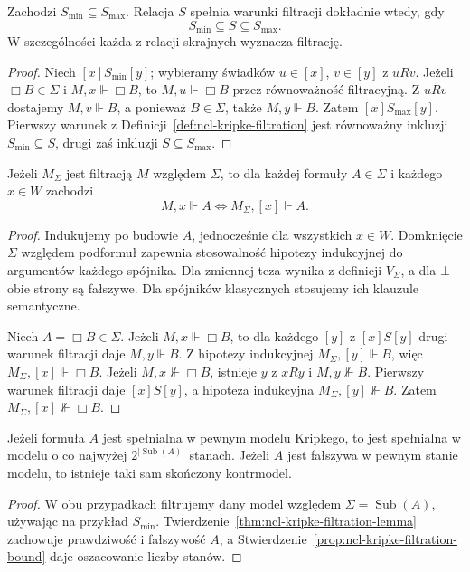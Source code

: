 \begin{stwierdzenie}
\label{prop:ncl-kripke-filtration-extremes}
Zachodzi $S_{\min}\subseteq S_{\max}$.
Relacja $S$ spełnia warunki filtracji
dokładnie wtedy, gdy
\[
 S_{\min}\subseteq S\subseteq S_{\max}.
\]
W szczególności każda z relacji skrajnych
wyznacza filtrację.
\end{stwierdzenie}
\begin{proof}
Niech $[x]S_{\min}[y]$; wybieramy świadków
$u\in[x]$, $v\in[y]$ z $uRv$.
Jeżeli $\Box B\in\Sigma$ i $M,x\Vdash\Box B$,
to $M,u\Vdash\Box B$ przez równoważność
filtracyjną. Z $uRv$ dostajemy $M,v\Vdash B$,
a ponieważ $B\in\Sigma$, także $M,y\Vdash B$.
Zatem $[x]S_{\max}[y]$.
Pierwszy warunek z
Definicji~\ref{def:ncl-kripke-filtration}
jest równoważny inkluzji $S_{\min}\subseteq S$,
drugi zaś inkluzji $S\subseteq S_{\max}$.
\end{proof}

\begin{twierdzenie}
\label{thm:ncl-kripke-filtration-lemma}
Jeżeli $M_\Sigma$ jest filtracją $M$
względem $\Sigma$, to dla każdej formuły
$A\in\Sigma$ i każdego $x\in W$ zachodzi
\[
 M,x\Vdash A\iff M_\Sigma,[x]\Vdash A.
\]
\end{twierdzenie}
\begin{proof}
Indukujemy po budowie $A$, jednocześnie
dla wszystkich $x\in W$.
Domknięcie $\Sigma$ względem podformuł
zapewnia stosowalność hipotezy indukcyjnej
do argumentów każdego spójnika.
Dla zmiennej teza wynika z definicji
$V_\Sigma$, a dla $\bot$ obie strony są
fałszywe. Dla spójników klasycznych
stosujemy ich klauzule semantyczne.

Niech $A=\Box B\in\Sigma$.
Jeżeli $M,x\Vdash\Box B$, to dla każdego
$[y]$ z $[x]S[y]$ drugi warunek filtracji
daje $M,y\Vdash B$. Z hipotezy indukcyjnej
$M_\Sigma,[y]\Vdash B$, więc
$M_\Sigma,[x]\Vdash\Box B$.
Jeżeli $M,x\not\Vdash\Box B$, istnieje
$y$ z $xRy$ i $M,y\not\Vdash B$.
Pierwszy warunek filtracji daje $[x]S[y]$,
a hipoteza indukcyjna
$M_\Sigma,[y]\not\Vdash B$. Zatem
$M_\Sigma,[x]\not\Vdash\Box B$.
\end{proof}

\begin{wniosek}
\label{cor:ncl-kripke-filtration-finite-realization}
Jeżeli formuła $A$ jest spełnialna w pewnym
modelu Kripkego, to jest spełnialna w modelu
o co najwyżej $2^{|\operatorname{Sub}(A)|}$ stanach.
Jeżeli $A$ jest fałszywa w pewnym stanie modelu,
to istnieje taki sam skończony kontrmodel.
\end{wniosek}
\begin{proof}
W obu przypadkach filtrujemy dany model
względem $\Sigma=\operatorname{Sub}(A)$,
używając na przykład $S_{\min}$.
Twierdzenie~\ref{thm:ncl-kripke-filtration-lemma}
zachowuje prawdziwość i fałszywość $A$,
a Stwierdzenie~\ref{prop:ncl-kripke-filtration-bound}
daje oszacowanie liczby stanów.
\end{proof}

